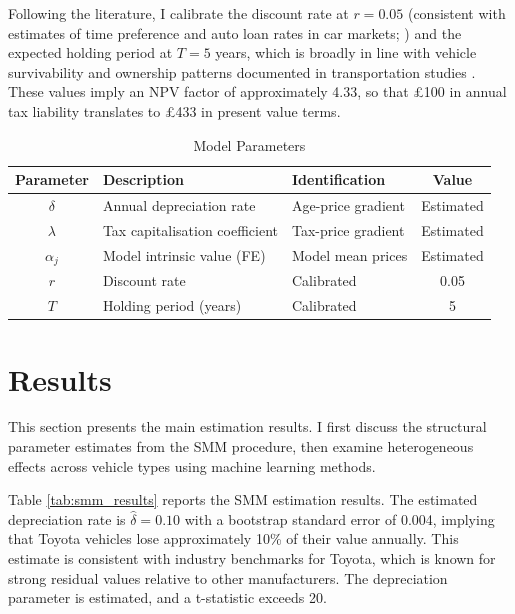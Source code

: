 \documentclass[12pt, a4paper]{article}
\begin{document}
Following the literature, I calibrate the discount rate at $r = 0.05$ (consistent with estimates of time preference and auto loan rates in car markets; \cite{dreyfusviscusi1995}) and the expected holding period at $T = 5$ years, which is broadly in line with vehicle survivability and ownership patterns documented in transportation studies \citep{lu2006}. These values imply an NPV factor of approximately 4.33, so that \pounds 100 in annual tax liability translates to \pounds 433 in present value terms.

\begin{table}[H]
\centering
\caption{Model Parameters}
\label{tab:parameters}
\begin{tabular}{cllc}
\toprule
Parameter & Description & Identification & Value \\
\midrule
$\delta$ & Annual depreciation rate & Age-price gradient & Estimated \\
$\lambda$ & Tax capitalisation coefficient & Tax-price gradient & Estimated \\
$\alpha_j$ & Model intrinsic value (FE) & Model mean prices & Estimated \\
$r$ & Discount rate & Calibrated & 0.05 \\
$T$ & Holding period (years) & Calibrated & 5 \\
\bottomrule
\end{tabular}
\end{table}

\section{Results}

This section presents the main estimation results. I first discuss the structural parameter estimates from the SMM procedure, then examine heterogeneous effects across vehicle types using machine learning methods.

Table \ref{tab:smm_results} reports the SMM estimation results. The estimated depreciation rate is $\hat{\delta} = 0.10$ with a bootstrap standard error of 0.004, implying that Toyota vehicles lose approximately 10\% of their value annually. This estimate is consistent with industry benchmarks for Toyota, which is known for strong residual values relative to other manufacturers. The depreciation parameter is estimated, and a t-statistic exceeds 20.
\end{document}

